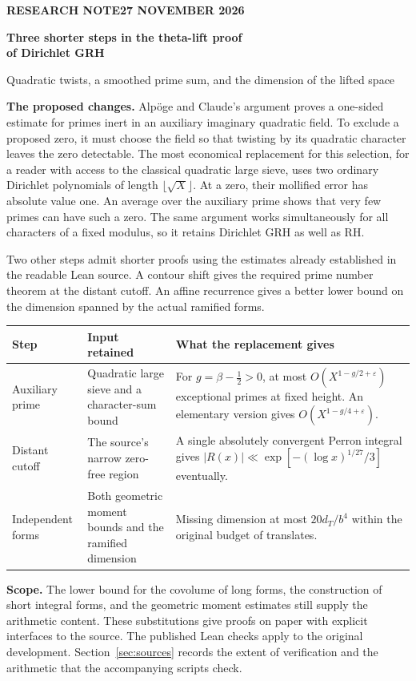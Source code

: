 \documentclass[11pt,letterpaper]{article}
\newcommand{\Half}{\tfrac12}
\newcommand{\e}{\varepsilon}
\begin{document}
\thispagestyle{plain}
{\small\bfseries\color{accent} RESEARCH NOTE\hfill 27 NOVEMBER 2026}\par
\vspace{0.6em}
{\LARGE\bfseries\color{ink} Three shorter steps in the theta-lift proof\\[.15em] of Dirichlet GRH}\par
\vspace{0.3em}
{\large Quadratic twists, a smoothed prime sum, and the dimension of the lifted space}\par
\vspace{0.5em}
\textbf{The proposed changes.}
Alpöge and Claude's argument \cite{source,origin} proves a one-sided estimate for primes inert in an auxiliary imaginary quadratic field. To exclude a proposed zero, it must choose the field so that twisting by its quadratic character leaves the zero detectable. The most economical replacement for this selection, for a reader with access to the classical quadratic large sieve, uses two ordinary Dirichlet polynomials of length $\lfloor\sqrt X\rfloor$. At a zero, their mollified error has absolute value one. An average over the auxiliary prime shows that very few primes can have such a zero. The same argument works simultaneously for all characters of a fixed modulus, so it retains Dirichlet GRH as well as RH.

Two other steps admit shorter proofs using the estimates already established in the readable Lean source. A contour shift gives the required prime number theorem at the distant cutoff. An affine recurrence gives a better lower bound on the dimension spanned by the actual ramified forms.
\begin{center}\small\renewcommand{\arraystretch}{1.24}
\begin{tabularx}{\linewidth}{@{}p{.18\linewidth}X X@{}}
\toprule
Step & Input retained & What the replacement gives\\\midrule
Auxiliary prime & Quadratic large sieve and a character-sum bound & For $g=\beta-\Half>0$, at most $O(X^{1-g/2+\e})$ exceptional primes at fixed height. An elementary version gives $O(X^{1-g/4+\e})$.\\
Distant cutoff & The source's narrow zero-free region & A single absolutely convergent Perron integral gives $|R(x)|\ll\exp[-(\log x)^{1/27}/3]$ eventually.\\
Independent forms & Both geometric moment bounds and the ramified dimension & Missing dimension at most $20d_T/b^4$ within the original budget of translates.\\
\bottomrule
\end{tabularx}\end{center}
\textbf{Scope.} The lower bound for the covolume of long forms, the construction of short integral forms, and the geometric moment estimates still supply the arithmetic content. These substitutions give proofs on paper with explicit interfaces to the source. The published Lean checks apply to the original development. Section~\ref{sec:sources} records the extent of verification and the arithmetic that the accompanying scripts check.
\end{document}
